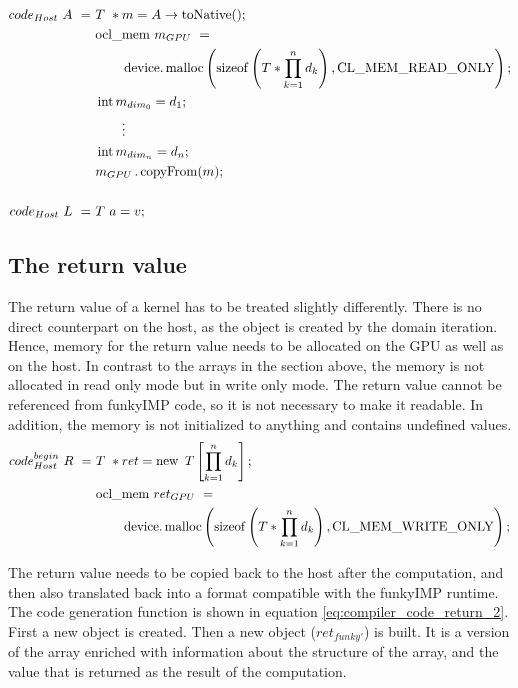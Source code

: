 \begin{align}
\label{eq:compiler_code_array}
code_{Host}\ A\ = &\ T\ *m = A\rightarrow \operatorname{toNative();} \\
           				&\ \text{ocl\_mem}\ m_{GPU}\ = \notag\\
           				&\ \qquad\operatorname{device.malloc}\left (\operatorname{sizeof}\left(T * \prod_{k=1}^n d_k\right),\operatorname{CL\_MEM\_READ\_ONLY}\right);\notag\\
            			&\ \operatorname{int} m_{dim_0}= d_1;\notag\\
            			&\ \qquad\vdots\notag\\
            			&\ \operatorname{int} m_{dim_n}= d_n; \notag\\
            			&\ m_{GPU}\operatorname{.copyFrom}(m);\notag\\
            			&\ \notag\\
	\label{eq:compiler_code_local}
code_{Host}\ L\ = &\ T\ a = v;
\end{align}



\subsection{The return value}
The return value of a kernel has to be treated slightly differently. There is no direct counterpart on the host, as the object is created by the domain iteration. Hence, memory for the return value needs to be allocated on the GPU as well as on the host. In contrast to the arrays in the section above, the memory is not allocated in read only mode but in write only mode. The return value cannot be referenced from funkyIMP code, so it is not necessary to make it readable. In addition, the memory is not initialized to anything and contains undefined values. \\

\begin{align}
\label{eq:compiler_code_return}
code_{Host}^{begin}\ R\ = &\ T\ *ret = \operatorname{new}\ T\left[\prod_{k=1}^n d_k\right];  \\
           			&\ \text{ocl\_mem}\ ret_{GPU}\ = \notag\\
           			&\ \qquad\operatorname{device.malloc}\left (\operatorname{sizeof}\left(T * \prod_{k=1}^n d_k\right),\operatorname{CL\_MEM\_WRITE\_ONLY}\right);\notag
\end{align}


The return value needs to be copied back to the host after the computation, and then also translated back into a format compatible with the funkyIMP runtime. The code generation function is shown in equation \ref{eq:compiler_code_return_2}. First a new  object is created. Then a new  object ($ret_{funky'}$) is built. It is a version of the array enriched with information about the structure of the array, and the value that is returned as the result of the computation.

